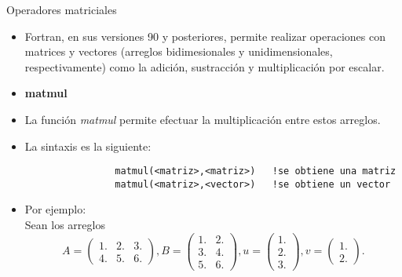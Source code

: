 \begin{frame}[fragile]{Operadores matriciales} 
    \begin{itemize}[<+(0)->]
        \item Fortran, en sus versiones 90 y posteriores, permite realizar operaciones con matrices y vectores (arreglos bidimesionales y unidimensionales, respectivamente) como la adición, sustracción y multiplicación por escalar.
        \item [] \textbf{matmul}
        \item La función \emph{matmul} permite efectuar la multiplicación entre estos arreglos.
        \item La sintaxis es la siguiente: \\
        \vspace{0.1cm}
            \begin{verbatim}
                matmul(<matriz>,<matriz>)   !se obtiene una matriz
                matmul(<matriz>,<vector>)   !se obtiene un vector
            \end{verbatim}
        \item [] Por ejemplo: \\
        Sean los arreglos
            \begin{equation*}
            A = \begin{pmatrix}
                    1. & 2. & 3.\\
                    4. & 5. & 6.
                \end{pmatrix},  
            B = \begin{pmatrix}
                    1. & 2.\\
                    3. & 4.\\
                    5. & 6.
                \end{pmatrix},  
            u = \begin{pmatrix}
                    1.\\
                    2.\\
                    3.
                \end{pmatrix},  
            v = \begin{pmatrix}
                    1.\\
                    2.  
                \end{pmatrix}.
            \end{equation*} 
    \end{itemize}
\end{frame}


